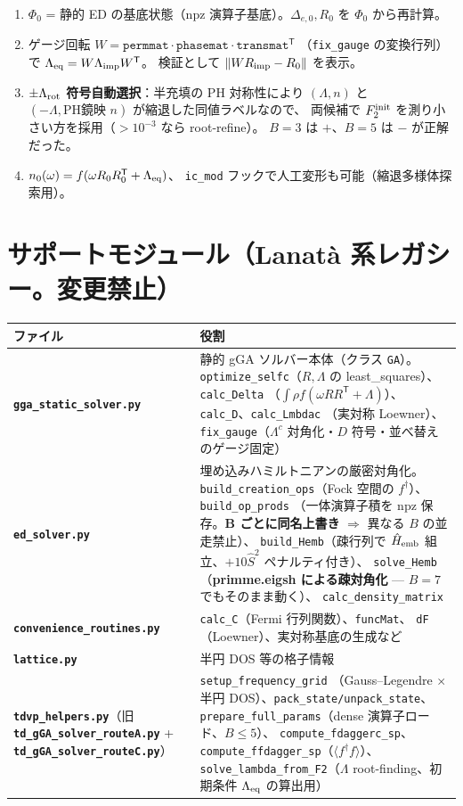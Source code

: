 \documentclass[11pt]{ltjsarticle}
\newcommand{\code}[1]{\texttt{#1}}
\newcommand{\file}[1]{\textbf{\texttt{#1}}}
\begin{document}
\begin{enumerate}
\item $\Phi_0$ = 静的 ED の基底状態（npz 演算子基底）。$\Delta_{e,0}, R_0$ を $\Phi_0$ から再計算。
\item ゲージ回転 $W=\code{permmat}\cdot\code{phasemat}\cdot\code{transmat}^{\mathsf T}$
（\code{fix\_gauge} の変換行列）で $\Lambda_{\rm eq}=W\Lambda_{\rm imp}W^{\mathsf T}$。
検証として $\|W R_{\rm imp}-R_0\|$ を表示。
\item \textbf{$\pm\Lambda_{\rm rot}$ 符号自動選択}：半充填の PH 対称性により
$(\Lambda,n)$ と $(-\Lambda,\text{PH鏡映 } n)$ が縮退した同値ラベルなので、
両候補で $F_2^{\rm init}$ を測り小さい方を採用（$>10^{-3}$ なら root-refine）。
$B=3$ は $+$、$B=5$ は $-$ が正解だった。
\item $n_0(\omega)=f(\omega R_0R_0^{\mathsf T}+\Lambda_{\rm eq})$、
\code{ic\_mod} フックで人工変形も可能（縮退多様体探索用）。
\end{enumerate}

\section{サポートモジュール（Lanat\`a 系レガシー。変更禁止）}

\begin{longtable}{p{}p{}}
\toprule
ファイル & 役割 \\
\midrule
\file{gga\_static\_solver.py} & 静的 gGA ソルバー本体（クラス \code{GA}）。
\code{optimize\_selfc}（$R,\Lambda$ の least\_squares）、\code{calc\_Delta}
（$\int\rho f(\omega RR^{\mathsf T}+\Lambda)$）、\code{calc\_D}、\code{calc\_Lmbdac}
（実対称 Loewner）、\code{fix\_gauge}（$\Lambda^c$ 対角化・$D$ 符号・並べ替えのゲージ固定） \\
\file{ed\_solver.py} & 埋め込みハミルトニアンの厳密対角化。
\code{build\_creation\_ops}（Fock 空間の $f^\dagger$）、\code{build\_op\_prods}
（一体演算子積を npz 保存。\textbf{B ごとに同名上書き} $\Rightarrow$ 異なる $B$ の並走禁止）、
\code{build\_Hemb}（疎行列で $\hat H_{\rm emb}$ 組立、$+10\hat S^2$ ペナルティ付き）、
\code{solve\_Hemb}（\textbf{primme.eigsh による疎対角化} — $B=7$ でもそのまま動く）、
\code{calc\_density\_matrix} \\
\file{convenience\_routines.py} & \code{calc\_C}（Fermi 行列関数）、\code{funcMat}、
\code{dF}（Loewner）、実対称基底の生成など \\
\file{lattice.py} & 半円 DOS 等の格子情報 \\
\file{tdvp\_helpers.py}（旧 \file{td\_gGA\_solver\_routeA.py} +
\file{td\_gGA\_solver\_routeC.py}） & \code{setup\_frequency\_grid}
（Gauss--Legendre $\times$ 半円 DOS）、\code{pack\_state/unpack\_state}、
\code{prepare\_full\_params}（dense 演算子ロード、$B\le5$）、
\code{compute\_fdaggerc\_sp}、\code{compute\_ffdagger\_sp}（$\langle f^\dagger f\rangle$）、
\code{solve\_lambda\_from\_F2}（$\Lambda$ root-finding、初期条件 $\Lambda_{\rm eq}$ の算出用） \\
\bottomrule
\end{longtable}
\end{document}
